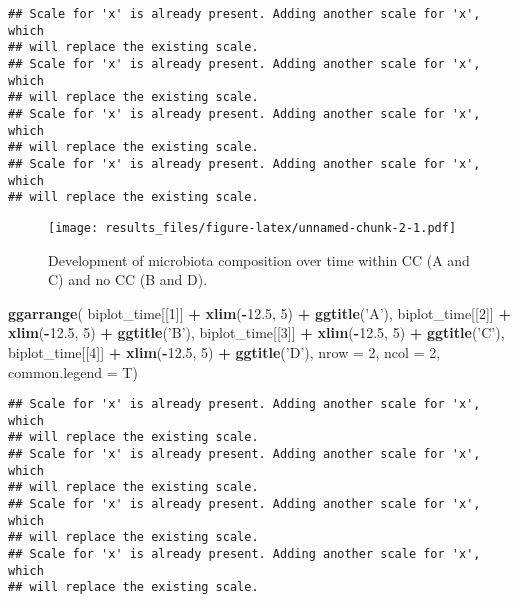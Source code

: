 \documentclass[]{article}
\newenvironment{Shaded}{\begin{snugshade}}{\end{snugshade}}
\newcommand{\KeywordTok}[1]{\textcolor[rgb]{0.13,0.29,0.53}{\textbf{#1}}}
\newcommand{\DataTypeTok}[1]{\textcolor[rgb]{0.13,0.29,0.53}{#1}}
\newcommand{\DecValTok}[1]{\textcolor[rgb]{0.00,0.00,0.81}{#1}}
\newcommand{\FloatTok}[1]{\textcolor[rgb]{0.00,0.00,0.81}{#1}}
\newcommand{\StringTok}[1]{\textcolor[rgb]{0.31,0.60,0.02}{#1}}
\newcommand{\OperatorTok}[1]{\textcolor[rgb]{0.81,0.36,0.00}{\textbf{#1}}}
\newcommand{\NormalTok}[1]{#1}
\begin{document}
\begin{verbatim}
## Scale for 'x' is already present. Adding another scale for 'x', which
## will replace the existing scale.
## Scale for 'x' is already present. Adding another scale for 'x', which
## will replace the existing scale.
## Scale for 'x' is already present. Adding another scale for 'x', which
## will replace the existing scale.
## Scale for 'x' is already present. Adding another scale for 'x', which
## will replace the existing scale.
\end{verbatim}

\begin{figure}
\centering
\texttt{[image: results\_files/figure-latex/unnamed-chunk-2-1.pdf]}
\caption{Development of microbiota composition over time within CC (A
and C) and no CC (B and D).}
\end{figure}

\begin{Shaded}
\begin{Highlighting}[]
\KeywordTok{ggarrange}\NormalTok{(}
\NormalTok{    biplot_time[[}\DecValTok{1}\NormalTok{]] }\OperatorTok{+}\StringTok{ }\KeywordTok{xlim}\NormalTok{(}\OperatorTok{-}\FloatTok{12.5}\NormalTok{, }\DecValTok{5}\NormalTok{) }\OperatorTok{+}\StringTok{ }\KeywordTok{ggtitle}\NormalTok{(}\StringTok{'A'}\NormalTok{), }
\NormalTok{    biplot_time[[}\DecValTok{2}\NormalTok{]] }\OperatorTok{+}\StringTok{ }\KeywordTok{xlim}\NormalTok{(}\OperatorTok{-}\FloatTok{12.5}\NormalTok{, }\DecValTok{5}\NormalTok{) }\OperatorTok{+}\StringTok{ }\KeywordTok{ggtitle}\NormalTok{(}\StringTok{'B'}\NormalTok{), }
\NormalTok{    biplot_time[[}\DecValTok{3}\NormalTok{]] }\OperatorTok{+}\StringTok{ }\KeywordTok{xlim}\NormalTok{(}\OperatorTok{-}\FloatTok{12.5}\NormalTok{, }\DecValTok{5}\NormalTok{) }\OperatorTok{+}\StringTok{ }\KeywordTok{ggtitle}\NormalTok{(}\StringTok{'C'}\NormalTok{), }
\NormalTok{    biplot_time[[}\DecValTok{4}\NormalTok{]] }\OperatorTok{+}\StringTok{ }\KeywordTok{xlim}\NormalTok{(}\OperatorTok{-}\FloatTok{12.5}\NormalTok{, }\DecValTok{5}\NormalTok{) }\OperatorTok{+}\StringTok{ }\KeywordTok{ggtitle}\NormalTok{(}\StringTok{'D'}\NormalTok{), }
    \DataTypeTok{nrow =} \DecValTok{2}\NormalTok{, }\DataTypeTok{ncol =} \DecValTok{2}\NormalTok{, }
    \DataTypeTok{common.legend =}\NormalTok{ T)}
\end{Highlighting}
\end{Shaded}

\begin{verbatim}
## Scale for 'x' is already present. Adding another scale for 'x', which
## will replace the existing scale.
## Scale for 'x' is already present. Adding another scale for 'x', which
## will replace the existing scale.
## Scale for 'x' is already present. Adding another scale for 'x', which
## will replace the existing scale.
## Scale for 'x' is already present. Adding another scale for 'x', which
## will replace the existing scale.
\end{verbatim}
\end{document}
